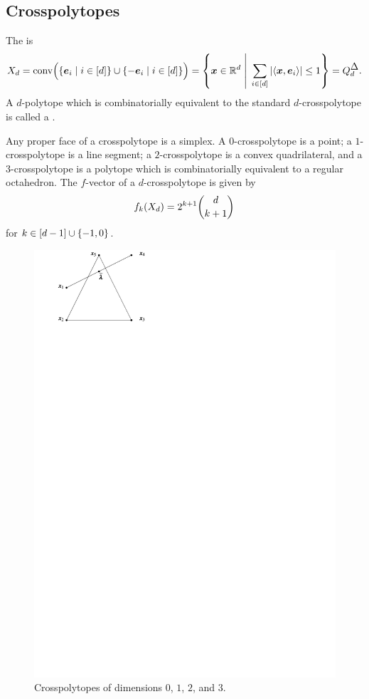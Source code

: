     \subsection{Crosspolytopes}

    The  is
        \[
            \xp d
                =   \conv\Bigl(\setb{\ve e_i}{i\in\brac d}\cup\setb{-\ve e_i}{i\in\brac d}\Bigr)
                =   \setb{\ve x\in\R d}{\sum_{i\in\brac d}\abs{\ip{\ve x}{\ve e_i}}\le1}=\cube d^{\tri}.
        \]
    A \(d\)-polytope which is combinatorially equivalent to the standard \(d\)-crosspolytope is called a .

    Any proper face of a crosspolytope is a simplex.  A \(0\)-crosspolytope is a point; a \(1\)-crosspolytope is a line segment; a \(2\)-crosspolytope is a convex quadrilateral, and a \(3\)-crosspolytope is a polytope which is combinatorially equivalent to a regular octahedron.  The \(f\)-vector of a \(d\)-crosspolytope is given by
        \[
            f_k(X_{d})
                =   2^{k+1}\binom d{k+1}
        \]
    for \(k\in\left[d-1\right]\cup\left\{-1,0\right\}\).

    \begin{center}
        \begin{figure}[h!bt]
            \includegraphics[page=6, width=.8\textwidth]{pictures.pdf}
            \caption{Crosspolytopes of dimensions $0$, $1$, $2$, and $3$.}
        \end{figure}
    \end{center}

